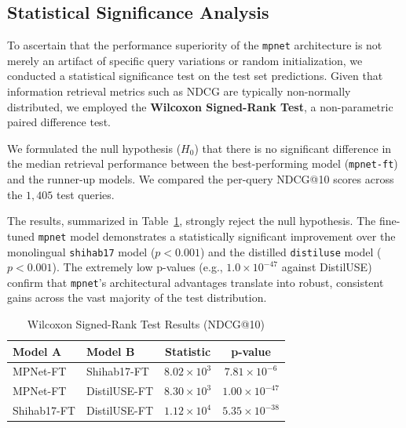 \documentclass[manuscript,screen,review]{acmart}
\begin{document}
\subsection{Statistical Significance Analysis}

To ascertain that the performance superiority of the \texttt{mpnet} architecture is not merely an artifact of specific query variations or random initialization, we conducted a statistical significance test on the test set predictions. Given that information retrieval metrics such as NDCG are typically non-normally distributed, we employed the \textbf{Wilcoxon Signed-Rank Test}, a non-parametric paired difference test.

We formulated the null hypothesis ($H_0$) that there is no significant difference in the median retrieval performance between the best-performing model (\texttt{mpnet-ft}) and the runner-up models. We compared the per-query NDCG@10 scores across the $1,405$ test queries.

The results, summarized in Table~\ref{tab:significance}, strongly reject the null hypothesis. The fine-tuned \texttt{mpnet} model demonstrates a statistically significant improvement over the monolingual \texttt{shihab17} model ($p < 0.001$) and the distilled \texttt{distiluse} model ($p < 0.001$). The extremely low p-values (e.g., $1.0 \times 10^{-47}$ against DistilUSE) confirm that \texttt{mpnet}'s architectural advantages translate into robust, consistent gains across the vast majority of the test distribution.

\begin{table}[h]
    \centering
    \caption{Wilcoxon Signed-Rank Test Results (NDCG@10)}
    \label{tab:significance}
    \begin{tabular}{llcc}
        \toprule
        \textbf{Model A} & \textbf{Model B} & \textbf{Statistic} & \textbf{p-value} \\
        \midrule
        MPNet-FT & Shihab17-FT & $8.02 \times 10^3$ & $7.81 \times 10^{-6}$ \\
        MPNet-FT & DistilUSE-FT & $8.30 \times 10^3$ & $1.00 \times 10^{-47}$ \\
        Shihab17-FT & DistilUSE-FT & $1.12 \times 10^4$ & $5.35 \times 10^{-38}$ \\
        \bottomrule
    \end{tabular}
\end{table}
\end{document}
